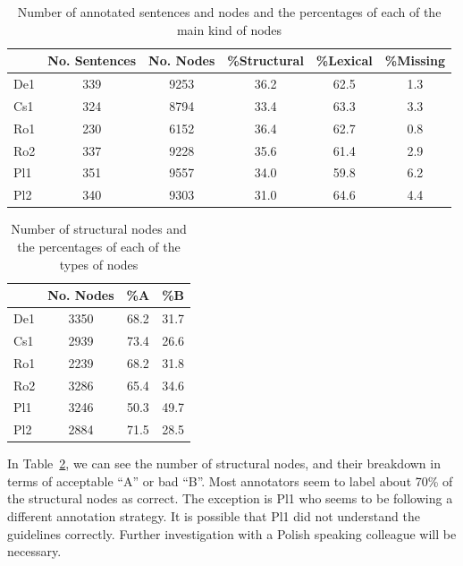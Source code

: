 \documentclass[11pt]{article}
\begin{document}
\begin{table}[h!]
\begin{center}
      \begin{tabular}{|l|c|c|c|c|c|}
      \hline
 & \bf{No. Sentences} & \bf{No. Nodes} & \bf{\%Structural} & \bf{\%Lexical}  & \bf{\%Missing} \\
\hline                               
    De1  &  339 &  9253 & 36.2 & 62.5 & 1.3 \\ 
    Cs1  & 324 &  8794 & 33.4 & 63.3 & 3.3\\ 
    Ro1  & 230 &  6152 & 36.4 & 62.7 & 0.8\\ 
    Ro2  & 337 &  9228 & 35.6 & 61.4 & 2.9 \\ 
    Pl1  & 351 &  9557 & 34.0 & 59.8 & 6.2 \\ 
    Pl2  & 340 &  9303 & 31.0 & 64.6 & 4.4 \\ 
      \hline
    \end{tabular}
\end{center}
\normalsize
\vspace*{-3ex}
\caption{Number of annotated sentences and nodes and the percentages of each of the main kind of nodes
}
\label{tab:stat-all}
\end{table}

\begin{table}[h!]
\begin{center}
      \begin{tabular}{|l|c|c|c|}
      \hline
   & \bf{No. Nodes} & \bf{\%A} & \bf{\%B}   \\
\hline                               
    De1  &  3350 &  68.2 & 31.7  \\ 
    Cs1  & 2939 &  73.4 & 26.6 \\ 
    Ro1  & 2239 &  68.2 & 31.8  \\ 
    Ro2  & 3286 &  65.4 & 34.6 \\ 
    Pl1  & 3246 &  50.3 & 49.7 \\ 
    Pl2  & 2884 &  71.5 & 28.5 \\ 
      \hline
    \end{tabular}
\end{center}
\normalsize
\vspace*{-3ex}
\caption{Number of structural  nodes and the percentages of each of the types of nodes
}
\label{tab:stat-struct}
\end{table}

In Table~\ref{tab:stat-struct}, we can see the number of structural nodes, and their
breakdown in terms of acceptable  ``A'' or bad ``B''. Most annotators seem to 
label about 70\% of the structural nodes as correct. The exception is Pl1 who
seems to be following a different annotation strategy. It is possible that Pl1 
did not understand the guidelines correctly. Further investigation with a Polish
speaking colleague will be necessary.
\end{document}
